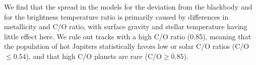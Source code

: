We find that the spread in the models for   the deviation from the blackbody and for the brightness temperature ratio is primarily caused by differences in metallicity and C/O ratio, with surface gravity and stellar temperature having little effect here. We rule out tracks with a high C/O ratio (0.85), meaning that the population of hot Jupiters statistically favors low or solar C/O ratios (C/O$\leq0.54$), and that high C/O planets are rare (C/O$\geq0.85$).







%
%




